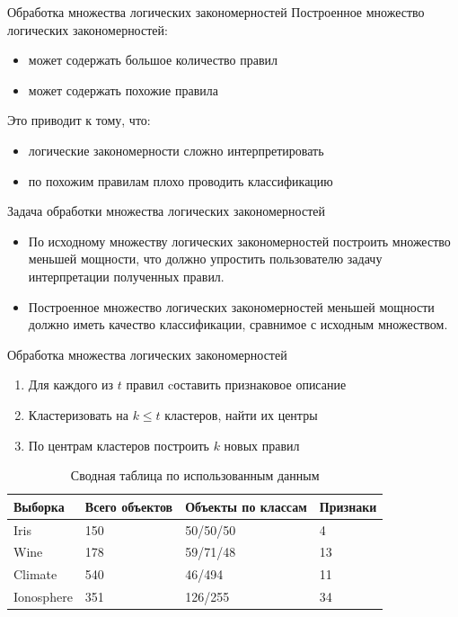 \documentclass[utf8]{beamer}
\begin{document}
\begin{frame}{Обработка множества логических закономерностей}
  Построенное множество логических закономерностей:
  \begin{itemize}
  \item может содержать большое количество правил
  \item может содержать похожие правила
  \end{itemize}
  Это приводит к тому, что:
  \begin{itemize}
  \item логические закономерности сложно интерпретировать
  \item по похожим правилам плохо проводить классификацию
  \end{itemize}
  \begin{block}{Задача обработки множества логических закономерностей}
    \begin{itemize}
      \item По исходному множеству логических закономерностей
        построить множество меньшей мощности, что должно упростить
        пользователю задачу интерпретации полученных правил.
      \item Построенное множество логических закономерностей меньшей
        мощности должно иметь качество классификации, сравнимое с
        исходным множеством.
      \end{itemize}
  \end{block}
\end{frame}

\begin{frame}{Обработка множества логических закономерностей}
  \begin{enumerate}
  \item Для каждого из \(t\) правил cоставить признаковое описание
  \item Кластеризовать на \(k\leq t\) кластеров, найти их центры
  \item По центрам кластеров построить \(k\) новых правил
  \end{enumerate}
    \begin{table}[!htbp]
      \begin{tabu}{X[1.2] X[2] X[2.8] X}
        Выборка & Всего объектов & Объекты по классам & Признаки\\\hline
        Iris & 150 & 50/50/50 & 4   \\
        Wine & 178 & 59/71/48 & 13  \\
        Climate & 540 & 46/494   & 11  \\
        Ionosphere & 351 & 126/255  & 34  \\
      \end{tabu}
      \caption{Сводная таблица по использованным данным}
    \end{table}
\end{frame}
\end{document}
